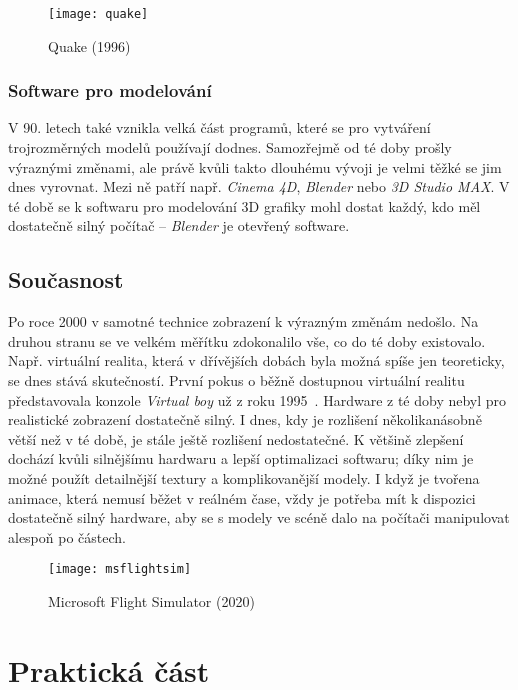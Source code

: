 \documentclass[a4paper, 11pt]{report}
\begin{document}
\begin{chapterwithoutpagebreak}
\begin{figure}[h]
    \centering
    \texttt{[image: quake]}
    \caption[Quake (1996)]{Quake (1996)~\cite{pic:quake}}
\end{figure}

\section{Software pro modelování}
V 90. letech také vznikla velká část programů, které se pro vytváření trojrozměrných modelů používají dodnes. Samozřejmě od té doby prošly výraznými změnami, ale právě kvůli takto dlouhému vývoji je velmi těžké se jim dnes vyrovnat. Mezi ně patří např. \emph{Cinema 4D}, \emph{Blender} nebo \emph{3D Studio MAX}. V té době se k softwaru pro modelování 3D grafiky mohl dostat každý, kdo měl dostatečně silný počítač -- \emph{Blender} je otevřený software.

\chapter{Současnost}
Po roce 2000 v samotné technice zobrazení k výrazným změnám nedošlo. Na druhou stranu se ve velkém měřítku zdokonalilo vše, co do té doby existovalo. Např. virtuální realita, která v dřívějších dobách byla možná spíše jen teoreticky, se dnes stává skutečností. První pokus o běžně dostupnou virtuální realitu představovala konzole \emph{Virtual boy} už z roku 1995~\cite{nintendowiki:virtualboy}. Hardware z té doby nebyl pro realistické zobrazení dostatečně silný. I dnes, kdy je rozlišení několikanásobně větší než v té době, je stále ještě rozlišení nedostatečné. K většině zlepšení dochází kvůli silnějšímu hardwaru a lepší optimalizaci softwaru; díky nim je možné použít detailnější textury a komplikovanější modely. I když je tvořena animace, která nemusí běžet v reálném čase, vždy je potřeba mít k dispozici dostatečně silný hardware, aby se s modely ve scéně dalo na počítači manipulovat alespoň po částech.

\begin{figure}[H]
    \centering
    \texttt{[image: msflightsim]}
    \caption[Microsoft Flight Simulator (2020)]{Microsoft Flight Simulator (2020)~\cite{pic:msflightsim}}
\end{figure}

\end{chapterwithoutpagebreak}
\part{Praktická část}
\end{document}
